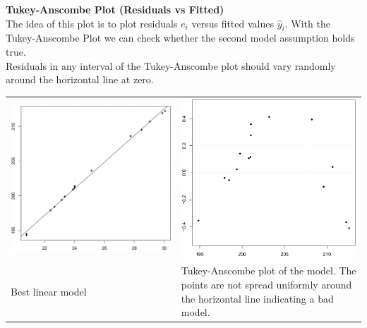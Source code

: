 \textbf{Tukey-Anscombe Plot (Residuals vs Fitted)}\\
The idea of this plot is to plot residuals $e_i$ versus fitted values $\hat{y}_i$.
With the Tukey-Anscombe Plot we can check whether the second model assumption holds true.\\
Residuals in any interval of the Tukey-Anscombe plot should vary randomly around the horizontal line at zero.

\begin{table}[H]
  \setlength{\tabcolsep}{0.2em}
  \scriptsize
  \begin{tabular}{p{}@{\hskip 1em}p{}}
    \includegraphics[width=\linewidth]{Pics/8.2.1.png}& \includegraphics[width=\linewidth]{Pics/8.2.2.png} \\
    Best linear model &
    Tukey-Anscombe plot of the model. The points are not spread uniformly around the horizontal line indicating a bad model.\\
  \end{tabular}
\end{table}

